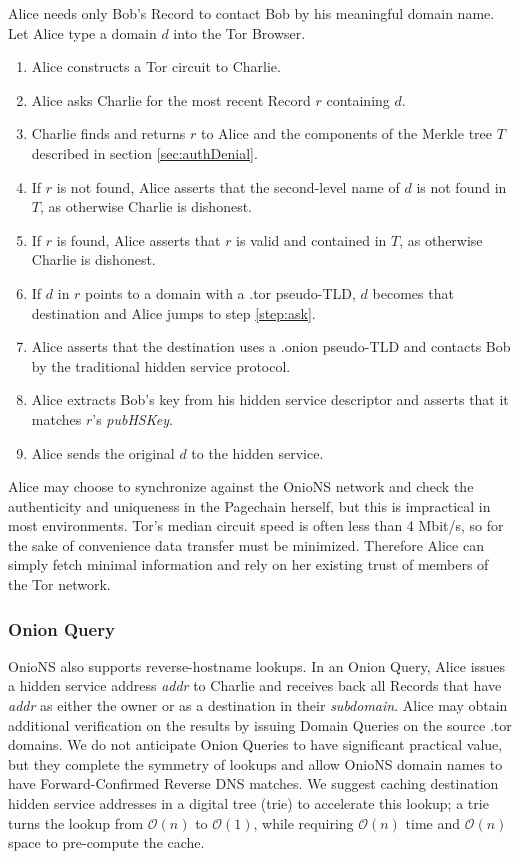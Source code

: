 \documentclass[conference]{IEEEtran}
\begin{document}
Alice needs only Bob's Record to contact Bob by his meaningful domain name. Let Alice type a domain $ d $ into the Tor Browser.

\begin{enumerate}
	\item Alice constructs a Tor circuit to Charlie.
	\item \label{step:ask} Alice asks Charlie for the most recent Record $ r $ containing $ d $.
	\item Charlie finds and returns $ r $ to Alice and the components of the Merkle tree $ T $ described in section \ref{sec:authDenial}.
	\item If $ r $ is not found, Alice asserts that the second-level name of $ d $ is not found in $ T $, as otherwise Charlie is dishonest.
	\item If $ r $ is found, Alice asserts that $ r $ is valid and contained in $ T $, as otherwise Charlie is dishonest.
	\item If $ d $ in $ r $ points to a domain with a .tor pseudo-TLD, $ d $ becomes that destination and Alice jumps to step \ref{step:ask}.
	\item Alice asserts that the destination uses a .onion pseudo-TLD and contacts Bob by the traditional hidden service protocol.
	\item Alice extracts Bob's key from his hidden service descriptor and asserts that it matches $ r $'s \emph{pubHSKey}.
	\item Alice sends the original $ d $ to the hidden service.
\end{enumerate}

Alice may choose to synchronize against the OnioNS network and check the authenticity and uniqueness in the Pagechain herself, but this is impractical in most environments. Tor's median circuit speed is often less than 4 Mbit/s,\cite{TorMetrics} so for the sake of convenience data transfer must be minimized. Therefore Alice can simply fetch minimal information and rely on her existing trust of members of the Tor network.

\subsubsection{Onion Query}

OnioNS also supports reverse-hostname lookups. In an Onion Query, Alice issues a hidden service address \emph{addr} to Charlie and receives back all Records that have \emph{addr} as either the owner or as a destination in their \emph{subdomain}. Alice may obtain additional verification on the results by issuing Domain Queries on the source .tor domains. We do not anticipate Onion Queries to have significant practical value, but they complete the symmetry of lookups and allow OnioNS domain names to have Forward-Confirmed Reverse DNS matches. We suggest caching destination hidden service addresses in a digital tree (trie) to accelerate this lookup; a trie turns the lookup from $ \mathcal{O}(n) $ to $ \mathcal{O}(1) $, while requiring $ \mathcal{O}(n) $ time and $ \mathcal{O}(n) $ space to pre-compute the cache.
\end{document}
